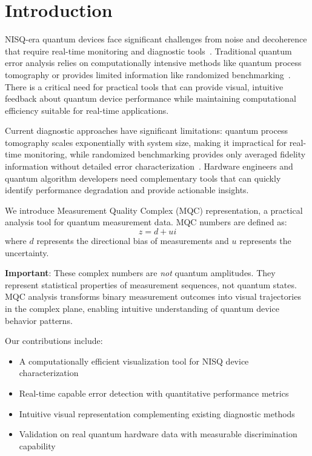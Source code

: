 \section{Introduction}

NISQ-era quantum devices face significant challenges from noise and decoherence that require real-time monitoring and diagnostic tools~\cite{preskill2018quantum}. Traditional quantum error analysis relies on computationally intensive methods like quantum process tomography or provides limited information like randomized benchmarking~\cite{nielsen2010quantum}. There is a critical need for practical tools that can provide visual, intuitive feedback about quantum device performance while maintaining computational efficiency suitable for real-time applications.

Current diagnostic approaches have significant limitations: quantum process tomography scales exponentially with system size, making it impractical for real-time monitoring, while randomized benchmarking provides only averaged fidelity information without detailed error characterization~\cite{arute2019quantum,zhong2020quantum}. Hardware engineers and quantum algorithm developers need complementary tools that can quickly identify performance degradation and provide actionable insights.

We introduce Measurement Quality Complex (MQC) representation, a practical analysis tool for quantum measurement data. MQC numbers are defined as:
\begin{equation}
z = d + ui
\end{equation}
where $d$ represents the directional bias of measurements and $u$ represents the uncertainty.

\textbf{Important}: These complex numbers are \emph{not} quantum amplitudes. They represent statistical properties of measurement sequences, not quantum states. MQC analysis transforms binary measurement outcomes into visual trajectories in the complex plane, enabling intuitive understanding of quantum device behavior patterns.

Our contributions include:
\begin{itemize}
\item A computationally efficient visualization tool for NISQ device characterization
\item Real-time capable error detection with quantitative performance metrics
\item Intuitive visual representation complementing existing diagnostic methods
\item Validation on real quantum hardware data with measurable discrimination capability
\end{itemize}

